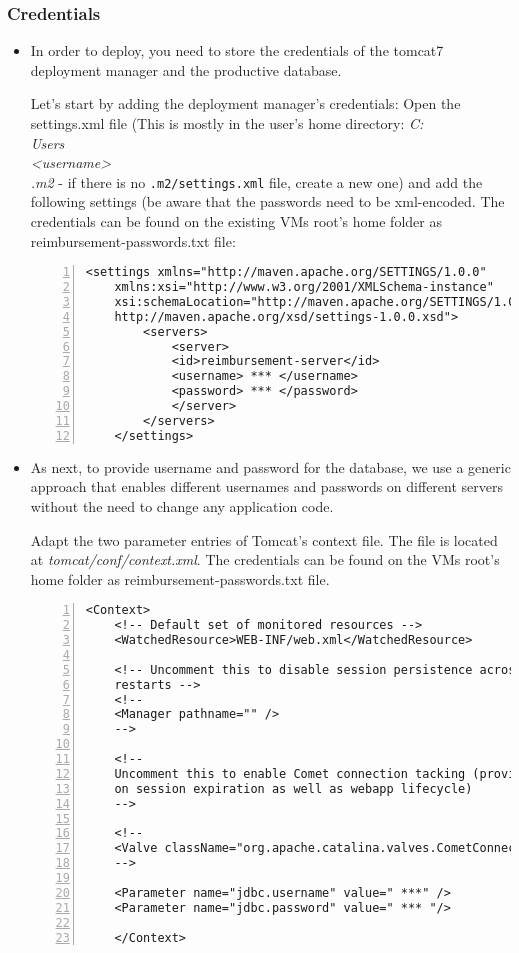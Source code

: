 \subsubsection{Credentials}
\begin{itemize}	
		\item In order to deploy, you need to store the credentials of the tomcat7 deployment manager and the productive database.\par
		
		Let's start by adding the deployment manager's credentials: Open the settings.xml file (This is mostly in the user's home directory: \textit{C:\\Users\\<username>\\.m2} - if there is no \texttt{.m2/settings.xml} file, create a new one)  and add the following settings (be aware that the passwords need to be xml-encoded. The credentials can be found on the existing VMs root's home folder as reimbursement-passwords.txt file:
	
	\begin{lstlisting}[numbers=left, breaklines=true]
	<settings xmlns="http://maven.apache.org/SETTINGS/1.0.0"
	xmlns:xsi="http://www.w3.org/2001/XMLSchema-instance"
	xsi:schemaLocation="http://maven.apache.org/SETTINGS/1.0.0
	http://maven.apache.org/xsd/settings-1.0.0.xsd">
		<servers>
			<server>
			<id>reimbursement-server</id>
			<username> *** </username>
			<password> *** </password>
			</server>
		</servers>
	</settings>
	\end{lstlisting}
	
	\item As next, to provide username and password for the database, we use a generic approach that enables different usernames and passwords on different servers without the need to change any application code. \par
	
	Adapt the two parameter entries of Tomcat’s context file. The file is located at \textit{tomcat/conf/context.xml}. The credentials can be found on the VMs root's home folder as reimbursement-passwords.txt file.
	
	\begin{lstlisting}[numbers=left, breaklines=true]
	<Context>
	<!-- Default set of monitored resources -->
	<WatchedResource>WEB-INF/web.xml</WatchedResource>
	
	<!-- Uncomment this to disable session persistence across Tomcat
	restarts -->
	<!--
	<Manager pathname="" />
	-->
	
	<!-- 
	Uncomment this to enable Comet connection tacking (provides events
	on session expiration as well as webapp lifecycle)
	-->
	
	<!-- 
	<Valve className="org.apache.catalina.valves.CometConnectionManagerValve" />
	-->
	
	<Parameter name="jdbc.username" value=" ***" />
	<Parameter name="jdbc.password" value=" *** "/>
	
	</Context>
	\end{lstlisting}

\end{itemize}

